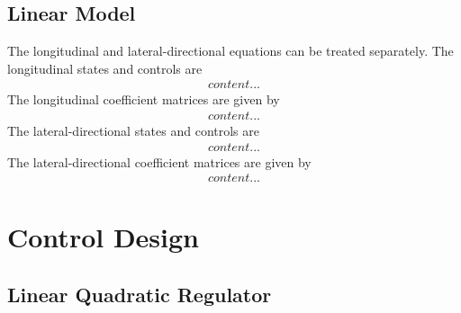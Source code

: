 \documentclass[a4paper, 12pt]{report}
\begin{document}
	\section{Linear Model}
	
	The longitudinal and lateral-directional equations can be treated separately. The longitudinal states and controls are
	\begin{align}
		content...
	\end{align}
	The longitudinal coefficient matrices are given by
	\begin{align}
		content...
	\end{align}
	The lateral-directional states and controls are
	\begin{align}
		content...
	\end{align}
	The lateral-directional coefficient matrices are given by
	\begin{align}
		content...
	\end{align}

	\chapter{Control Design}
	
	\lipsum[8]
	
	\section{Linear Quadratic Regulator}
	
	\lipsum[9]
	
\end{document}
